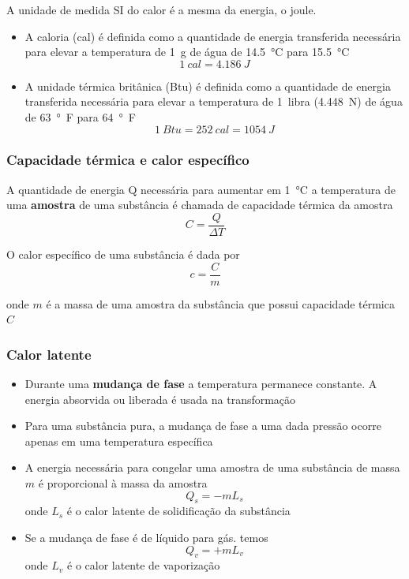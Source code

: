 \begin{frame}

    A unidade de medida SI do calor é a mesma da energia, o joule.
    \begin{itemize}
        \item A caloria (cal) é definida como a quantidade de energia transferida
            necessária para elevar a temperatura de \SI{1}{g} de água de
            \SI{14.5}{\celsius} para \SI{15,5}{\celsius}
            \[
                \SI{1}{cal} = \SI{4,186}{J}
            \]

        \item A unidade térmica britânica (Btu) é definida como a quantidade de energia
            transferida necessária para elevar a temperatura de \SI{1}{libra}
            (\SI{4,448}{N}) de água de \SI{63}{\degree F} para \SI{64}{\degree F}
            \[
                \SI{1}{Btu} = \SI{252}{cal} = \SI{1054}{J}
            \]
    \end{itemize} 
\end{frame}

\begin{frame}
    \frametitle{Capacidade térmica e calor específico}
    A quantidade de energia Q necessária para aumentar em \SI{1}{\celsius} a
    temperatura de uma \textbf{amostra} de uma substância é chamada de capacidade
    térmica da amostra
    \[
        C=\frac{Q}{\Delta T}
    \]

    O calor específico de uma substância é dada por
    \[
        c=\frac{C}{m}
    \]

    onde $m$ é a massa de uma amostra da substância que possui capacidade térmica $C$
\end{frame}

\begin{frame}
    \frametitle{Calor latente}

    \begin{itemize}
        \item Durante uma \textbf{mudança de fase} a temperatura permanece constante. A
            energia absorvida ou liberada é usada na transformação

        \item Para uma substância pura, a mudança de fase a uma dada pressão ocorre
            apenas em uma temperatura específica

        \item A energia necessária para congelar uma amostra de uma substância de massa
            $m$ é proporcional à massa da amostra
            \[
                Q_s= -mL_s
            \]
            onde $L_s$ é o calor latente de solidificação da substância

        \item Se a mudança de fase é de líquido para gás. temos
            \[
                Q_v = +mL_v
            \]
            onde $L_v$ é o calor latente de vaporização
    \end{itemize}
\end{frame}

